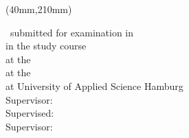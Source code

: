 %
%
\title{\IthesisTitle}   %
\author{\IthesisAuthor} %

\newpage
\thispagestyle{empty}
{\selectfont
  \hfuzz=20pt       %

  \vspace*{1cm}
  \begin{minipage}[b]{\textwidth}
    \fontsize{14pt}{20pt}
    \selectfont
    \begin{center}
      \IthesisAuthor
    \end{center}
  \end{minipage}

  \vspace{1.5cm}
  \begin{minipage}[b][0cm][t]{\textwidth}
    \fontsize{18pt}{20pt}
    \selectfont
    \begin{center}
      \IthesisTitleEN
    \end{center}
  \end{minipage}

  \begin{textblock*}{\textwidth}(40mm,210mm)
    \begin{minipage}[b]{\textwidth}
      \selectfont
      \fontsize{12pt}{14pt}
      \selectfont
      \ifdefined\ILanguageEN
        \IthesisKindEN ~submitted for examination in \IthesisExaminationEN \\
        in the study course \textit{\IstudyCourseName} \\
        at the \IthesisDepartmentFullEN \\
        at the \IthesisFacultyFullEN \\
        at University of Applied Science Hamburg\\

        Supervisor: \IfirstSv \\
        \ifdefined\IisTermPaper
        \else
          \ifdefined\IisInternshipReport
	  Supervised: \IsecondSv\\
          \else
        Supervisor: \IsecondSv \\
          \fi\fi
        

\end{minipage}
\end{textblock*}}
